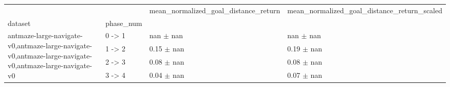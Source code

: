 \begin{tabular}{llll}
\toprule
 &  & mean_normalized_goal_distance_return & mean_normalized_goal_distance_return_scaled \\
dataset & phase_num &  &  \\
\midrule
\multirow[t]{4}{*}{antmaze-large-navigate-v0,antmaze-large-navigate-v0,antmaze-large-navigate-v0,antmaze-large-navigate-v0} & 0 -> 1 & nan $\pm$ nan & nan $\pm$ nan \\
 & 1 -> 2 & 0.15 $\pm$ nan & 0.19 $\pm$ nan \\
 & 2 -> 3 & 0.08 $\pm$ nan & 0.08 $\pm$ nan \\
 & 3 -> 4 & 0.04 $\pm$ nan & 0.07 $\pm$ nan \\
\cline{1-4}
\bottomrule
\end{tabular}
